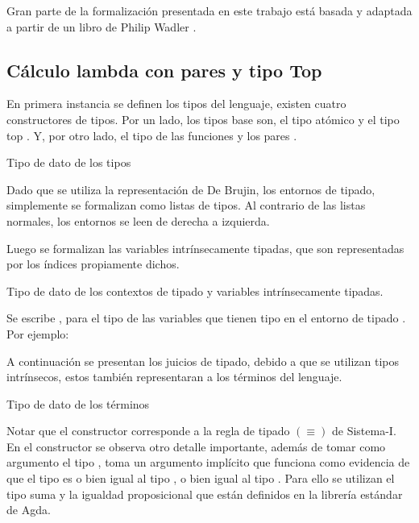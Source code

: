 Gran parte de la formalización presentada en este trabajo está basada y adaptada a partir de un libro de Philip Wadler \cite{plfa}.

\subsection{Cálculo lambda con pares y tipo Top}

En primera instancia se definen los tipos del lenguaje, existen cuatro constructores de tipos.
Por un lado, los tipos base son, el tipo atómico \const{$\tau$} y el tipo top \const{$\top$}.
Y, por otro lado, el tipo de las funciones \const{$\_\Rightarrow\_$} y los pares \const{$\_\times\_$}.

\begin{codigo}
	Tipo de dato de los tipos
	
\end{codigo}

Dado que se utiliza la representación de De Brujin, los entornos de tipado, simplemente se formalizan como listas de tipos.
Al contrario de las listas normales, los entornos se leen de derecha a izquierda.

Luego se formalizan las variables intrínsecamente tipadas, que son representadas por los índices propiamente dichos.

\begin{codigo}
	Tipo de dato de los contextos de tipado y variables intrínsecamente tipadas.
\end{codigo}

Se escribe \bound{$\Gamma$} \const{$\ni$} , para el tipo de las variables que tienen tipo  en el entorno de tipado \bound{$\Gamma$}.
Por ejemplo: 


A continuación se presentan los juicios de tipado, debido a que se utilizan tipos intrínsecos, estos también representaran a los términos del lenguaje.

\begin{codigo}
	Tipo de dato de los términos
	
\end{codigo}

Notar que el constructor \const{$[\_]\equiv\_$} corresponde a la regla de tipado $(\equiv)$ de Sistema-I.
En el constructor \const{$\pi$} se observa otro detalle importante, además de tomar como argumento el tipo , toma un argumento implícito que funciona como evidencia de que el tipo  es o bien igual al tipo , o bien igual al tipo .
Para ello se utilizan el tipo suma y la igualdad proposicional que están definidos en la librería estándar de Agda.


